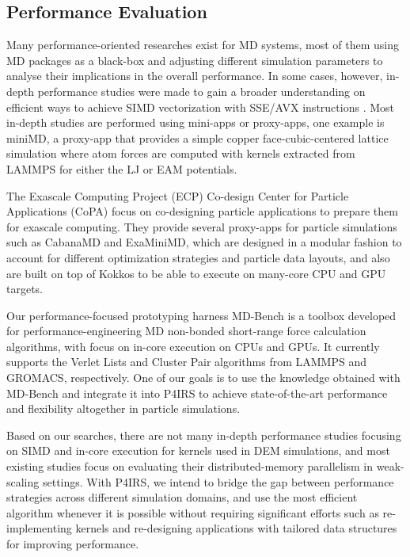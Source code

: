 \documentclass[preprint,12pt]{elsarticle}
\begin{document}
\subsection{Performance Evaluation}
\label{sec:perfeval}

Many performance-oriented researches exist for MD systems, most of them using MD packages as a black-box and adjusting different simulation parameters to analyse their implications in the overall performance.
In some cases, however, in-depth performance studies were made to gain a broader understanding on efficient ways to achieve SIMD vectorization with SSE/AVX instructions \cite{mdsimd}.
Most in-depth studies are performed using mini-apps or proxy-apps, one example is miniMD, a proxy-app that provides a simple copper face-cubic-centered lattice simulation where atom forces are computed with kernels extracted from LAMMPS for either the \ac{LJ} or \ac{EAM} potentials.

The Exascale Computing Project (ECP) Co-design Center for Particle Applications (CoPA) \cite{ecpcopa} focus on co-designing particle applications to prepare them for exascale computing.
They provide several proxy-apps for particle simulations such as CabanaMD and ExaMiniMD, which are designed in a modular fashion to account for different optimization strategies and particle data layouts, and also are built on top of Kokkos to be able to execute on many-core CPU and GPU targets.

Our performance-focused prototyping harness MD-Bench \cite{mdbench1,mdbench2} is a toolbox developed for performance-engineering \ac{MD} non-bonded short-range force calculation algorithms, with focus on in-core execution on CPUs and GPUs.
It currently supports the Verlet Lists and Cluster Pair algorithms from LAMMPS and GROMACS, respectively.
One of our goals is to use the knowledge obtained with MD-Bench and integrate it into P4IRS to achieve state-of-the-art performance and flexibility altogether in particle simulations.

Based on our searches, there are not many in-depth performance studies focusing on SIMD and in-core execution for kernels used in DEM simulations, and most existing studies focus on evaluating their distributed-memory parallelism in weak-scaling settings.
With P4IRS, we intend to bridge the gap between performance strategies across different simulation domains, and use the most efficient algorithm whenever it is possible without requiring significant efforts such as re-implementing kernels and re-designing applications with tailored data structures for improving performance.
\end{document}
